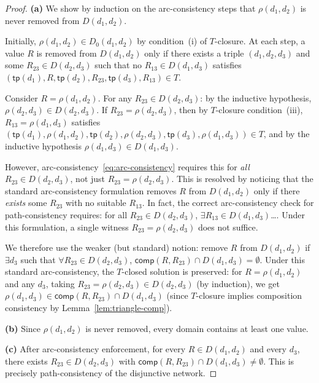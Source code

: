 \documentclass[a4paper,11pt]{article}
\theoremstyle{definition}
\newcommand{\comp}{\ensuremath{\mathsf{comp}}}
\begin{document}
\begin{proof}
\textbf{(a)}\; We show by induction on the arc-consistency steps
that $\rho(d_1, d_2)$ is never removed from $D(d_1, d_2)$.

Initially, $\rho(d_1, d_2) \in D_0(d_1, d_2)$ by condition~(i) of
$T$-closure.  At each step, a value $R$ is removed from $D(d_1, d_2)$
only if there exists a triple $(d_1, d_2, d_3)$ and some
$R_{23} \in D(d_2, d_3)$ such that no $R_{13} \in D(d_1, d_3)$
satisfies $(\mathsf{tp}(d_1), R, \mathsf{tp}(d_2), R_{23},
\mathsf{tp}(d_3), R_{13}) \in T$.

Consider $R = \rho(d_1, d_2)$.  For any $R_{23} \in D(d_2, d_3)$:
by the inductive hypothesis, $\rho(d_2, d_3) \in D(d_2, d_3)$.
If $R_{23} = \rho(d_2, d_3)$, then by $T$-closure condition~(iii),
$R_{13} = \rho(d_1, d_3)$ satisfies
$(\mathsf{tp}(d_1), \rho(d_1,d_2), \mathsf{tp}(d_2), \rho(d_2,d_3),
\mathsf{tp}(d_3), \rho(d_1,d_3)) \in T$,
and by the inductive hypothesis $\rho(d_1, d_3) \in D(d_1, d_3)$.

However, arc-consistency~\eqref{eq:arc-consistency} requires this for
\emph{all} $R_{23} \in D(d_2, d_3)$, not just $R_{23} = \rho(d_2,d_3)$.
This is resolved by noticing that the standard arc-consistency
formulation removes $R$ from $D(d_1, d_2)$ only if
there \emph{exists} some $R_{23}$ with no suitable $R_{13}$.
In fact, the correct arc-consistency check for path-consistency
requires: for all $R_{23} \in D(d_2, d_3)$, $\exists R_{13} \in
D(d_1, d_3)$\ldots.  Under this formulation, a single witness
$R_{23} = \rho(d_2, d_3)$ does not suffice.

We therefore use the weaker (but standard) notion: remove $R$ from
$D(d_1, d_2)$ if $\exists d_3$ such that $\forall R_{23} \in D(d_2,d_3)$,
$\comp(R, R_{23}) \cap D(d_1, d_3) = \emptyset$.
Under this standard arc-consistency, the $T$-closed solution is
preserved: for $R = \rho(d_1,d_2)$ and any $d_3$, taking
$R_{23} = \rho(d_2,d_3) \in D(d_2,d_3)$ (by induction), we get
$\rho(d_1,d_3) \in \comp(R, R_{23}) \cap D(d_1,d_3)$ (since
$T$-closure implies composition consistency by
Lemma~\ref{lem:triangle-comp}).

\medskip
\textbf{(b)}\; Since $\rho(d_1, d_2)$ is never removed, every
domain contains at least one value.

\medskip
\textbf{(c)}\; After arc-consistency enforcement, for every
$R \in D(d_1, d_2)$ and every $d_3$, there exists $R_{23} \in
D(d_2, d_3)$ with $\comp(R, R_{23}) \cap D(d_1, d_3) \neq \emptyset$.
This is precisely path-consistency of the disjunctive network.
\end{proof}
\end{document}
